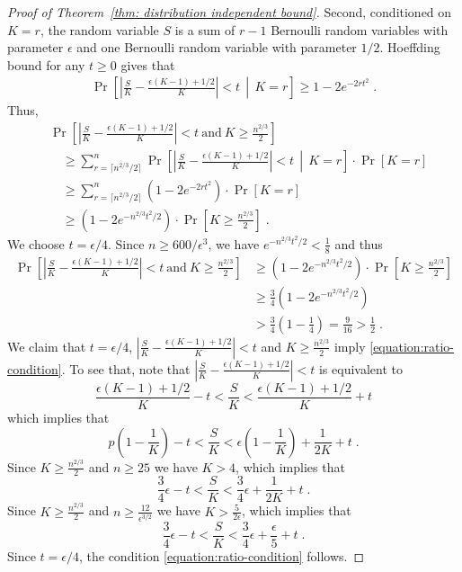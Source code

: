 \documentclass[11pt]{article}
\begin{document}
\begin{proof}[Proof of Theorem~\ref{thm: distribution independent bound}]
Second, conditioned on $K=r$, the random variable $S$
is a sum of $r-1$ Bernoulli random variables with parameter $\epsilon$
and one Bernoulli random variable with parameter $1/2$. Hoeffding bound for any $t \ge 0$
gives that
\begin{align*}
\Pr \left[ \left| \frac{S}{K} - \frac{\epsilon(K - 1) + 1/2}{K} \right| < t \, \middle| \, K = r \right] \ge 1 - 2 e^{-2 r t^2} \; .
\end{align*}
Thus,
\begin{align*}
& \Pr \left[ \left| \frac{S}{K} - \frac{\epsilon(K - 1) + 1/2}{K} \right| < t \ \text{and} \ K \ge \frac{n^{2/3}}{2} \right] \\
&\quad \ge \sum_{r = \lceil n^{2/3} / 2 \rceil}^n \Pr \left[ \left| \frac{S}{K} - \frac{\epsilon(K - 1) + 1/2}{K} \right| < t  \, \middle| \,  K = r \right] \cdot \Pr[K = r] \\
& \quad \ge \sum_{r = \lceil n^{2/3} / 2 \rceil}^n \left( 1 - 2 e^{-2 r t^2} \right) \cdot \Pr[K = r] \\
& \quad \ge \left( 1 - 2 e^{-n^{2/3}  t^2 / 2} \right) \cdot \Pr \left[ K \ge \frac{n^{2/3}}{2} \right] \; .
\end{align*}
We choose $t = \epsilon/4$. Since $n \ge 600/\epsilon^3$, we have $e^{-n^{2/3}  t^2 / 2} < \frac{1}{8}$ and thus
\begin{align*}
\Pr \left[ \left| \frac{S}{K} - \frac{\epsilon(K - 1) + 1/2}{K} \right| < t \ \text{and} \ K \ge \frac{n^{2/3}}{2} \right]
& \ge \left( 1 - 2 e^{-n^{2/3}  t^2 / 2} \right) \cdot \Pr \left[ K \ge \frac{n^{2/3}}{2} \right] \\
& \ge \frac{3}{4} \left( 1 - 2 e^{-n^{2/3}  t^2 / 2} \right) \\
& > \frac{3}{4} \left( 1 - \frac{1}{4} \right) = \frac{9}{16} > \frac{1}{2} \; .
\end{align*}
We claim that $t = \epsilon/4$,
$\left| \frac{S}{K} - \frac{\epsilon(K - 1) + 1/2}{K} \right| < t$
and $K \ge \frac{n^{2/3}}{2}$ imply \eqref{equation:ratio-condition}.
To see that, note that $\left| \frac{S}{K} - \frac{\epsilon(K - 1) + 1/2}{K} \right| < t$ is equivalent to
$$
\frac{\epsilon(K - 1) + 1/2}{K} - t < \frac{S}{K} < \frac{\epsilon(K - 1) + 1/2}{K} + t
$$
which implies that
$$
p \left(1 - \frac{1}{K} \right) - t < \frac{S}{K} < \epsilon \left(1 - \frac{1}{K} \right) + \frac{1}{2K} + t \; .
$$
Since $K \ge \frac{n^{2/3}}{2}$ and $n \ge 25$ we have $K > 4$, which implies that
$$
\frac{3}{4} \epsilon - t < \frac{S}{K} < \frac{3}{4} \epsilon + \frac{1}{2K} + t \; .
$$
Since $K \ge \frac{n^{2/3}}{2}$ and $n \ge \frac{12}{\epsilon^{3/2}}$ we have $K > \frac{5}{2\epsilon}$, which implies that
$$
\frac{3}{4} \epsilon - t < \frac{S}{K} < \frac{3}{4} \epsilon + \frac{\epsilon}{5} + t \; .
$$
Since $t = \epsilon/4$, the condition \eqref{equation:ratio-condition} follows.
\end{proof}
\end{document}
